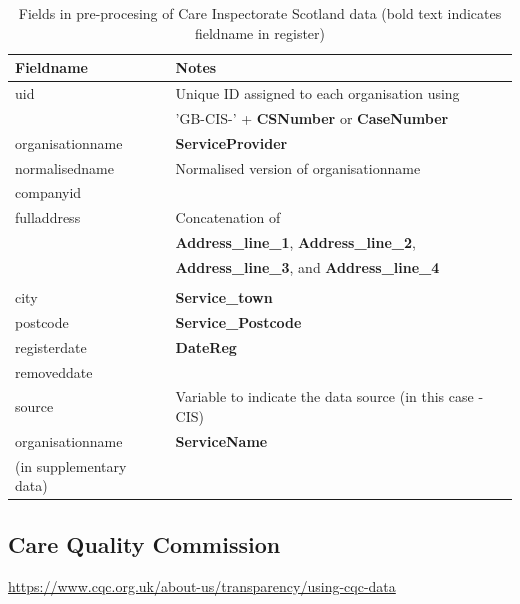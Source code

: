 \documentclass{article}
\begin{document}
\begin{table}[h]
  \centering
  \begin{tabularx}{\textwidth}{|l|X|}
    \hline
    Fieldname  &	Notes \\
    \hline \hline
uid & Unique ID assigned to each organisation using \\
&'GB-CIS-' + \textbf{CSNumber} or \textbf{CaseNumber}\\ \hline
organisationname & \textbf{ServiceProvider} \\ \hline
normalisedname & Normalised version of organisationname\\ \hline
companyid &  \\ \hline
fulladdress &  Concatenation of \\
& \textbf{Address\_line\_1}, \textbf{Address\_line\_2}, \\
& \textbf{Address\_line\_3}, and 
\textbf{Address\_line\_4}\\
\\ \hline
city & \textbf{Service\_town}\\ \hline
postcode & \textbf{Service\_Postcode}\\ \hline
registerdate & \textbf{DateReg} \\ \hline
removeddate & \\ \hline
source & Variable to indicate the data source (in this case - CIS) \\ \hline
\hline \hline
organisationname & \textbf{ServiceName} \\
(in supplementary data) & \\ \hline
\hline
\end{tabularx}
  \caption{Fields in pre-procesing of Care Inspectorate Scotland data (bold text indicates fieldname in register)}
  \label{tab:cis_preprocess}
  
\end{table}




\clearpage
\subsection{Care Quality Commission }
\url{https://www.cqc.org.uk/about-us/transparency/using-cqc-data}
\end{document}
